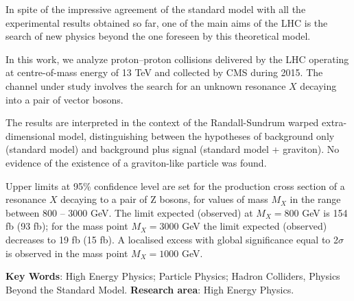In spite of the impressive agreement of the standard model with all the experimental results obtained so far, one of the main aims of the LHC is the search of new physics beyond the one foreseen by this theoretical model.

In this work, we analyze proton--proton collisions delivered by the LHC operating at centre-of-mass energy of 13 TeV and collected by CMS during 2015. The channel under study involves the search for an unknown resonance $X$ decaying into a pair of vector bosons. 

The results are interpreted in the context of the Randall-Sundrum warped extra-dimensional model, distinguishing between the  hypotheses of background only (standard model) and background plus signal (standard model + graviton).  No evidence of the existence of a graviton-like particle was found.%

Upper limits at 95\% confidence level are set for the production cross section of a resonance $X$ decaying to a pair of Z bosons, for values of mass $M_{X}$ in the range between 800 -- 3000 GeV. The limit expected (observed) at $M_{X}=800$ GeV is 154 fb (93 fb); for the mass point $M_{X}=3000$ GeV the limit expected (observed) decreases to 19 fb (15 fb). A localised excess with global significance equal to 2$\sigma$ is observed in the mass point $M_X=1000$ GeV. 

\vskip 1.0cm
\noindent
{\bf Key Words}: High Energy Physics; Particle Physics; Hadron Colliders, Physics Beyond the Standard Model.
\vskip 0.5cm
\noindent
{\bf Research area}: High Energy Physics.


\vfill \eject
